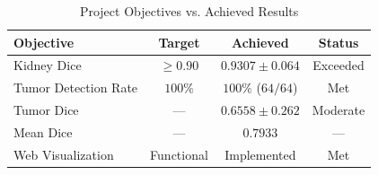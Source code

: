 
\begin{table}[!t]
\caption{Project Objectives vs. Achieved Results}
\label{tab:acceptance_criteria}
\centering
\begin{tabular}{@{}lccc@{}}
\toprule
\textbf{Objective} & \textbf{Target} & \textbf{Achieved} & \textbf{Status} \\
\midrule
Kidney Dice & $\geq 0.90$ & $0.9307 \pm 0.064$ & Exceeded \\
Tumor Detection Rate & $100\%$ & $100\%$ ($64/64$) & Met \\
Tumor Dice & --- & $0.6558 \pm 0.262$ & Moderate \\
Mean Dice & --- & $0.7933$ & --- \\
Web Visualization & Functional & Implemented & Met \\
\bottomrule
\end{tabular}
\end{table}
